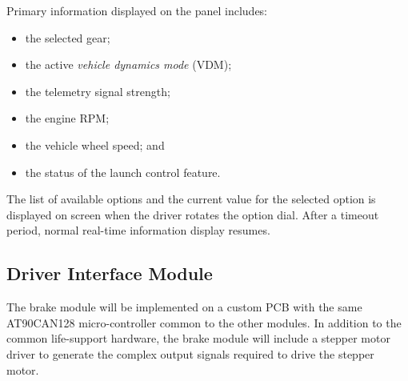 Primary information displayed on the panel includes:

\begin{itemize}
\item the selected gear;
\item the active \emph{vehicle dynamics mode} (VDM);
\item the telemetry signal strength;
\item the engine RPM;
\item the vehicle wheel speed; and
\item the status of the launch control feature.
\end{itemize}

The list of available options and the current value for the selected option is displayed on screen when the driver rotates the option dial. After a timeout period, normal real-time information display resumes. 

\subsection{Driver Interface Module}

The brake module will be implemented on a custom PCB with the same AT90CAN128 micro-controller common to the other modules. In addition to the common life-support hardware, the brake module will include a stepper motor driver to generate the complex output signals required to drive the stepper motor.

